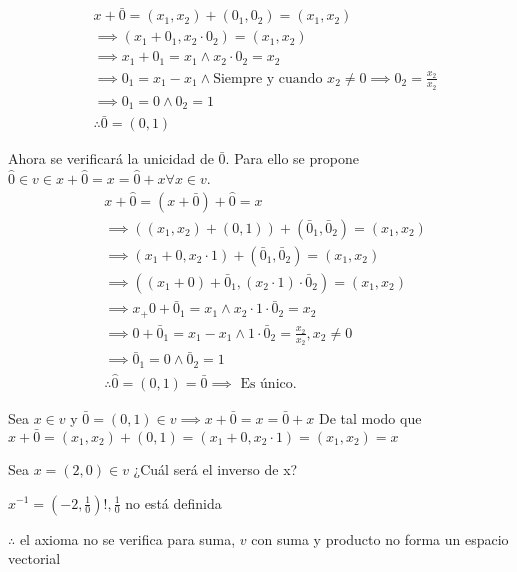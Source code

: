 \begin{exercise}[Sean $x\in v$ y $\bar{0}\in v\implies x+\bar{0}=x=\bar{0}+x$]
	\begin{align*}
		 & x+\bar{0}=(x_1,x_2)+(0_1,0_2)=(x_1,x_2)                                                 \\
		 & \implies (x_1+0_1,x_2\cdot 0_2)=(x_1,x_2)                                               \\
		 & \implies x_1+0_1=x_1\land x_2\cdot 0_2=x_2                                              \\
		 & \implies 0_1=x_1-x_1\land \text{Siempre y cuando }x_2\neq 0\implies 0_2=\frac{x_2}{x_2} \\
		 & \implies 0_1=0\land 0_2=1                                                               \\
		 & \therefore \bar{0}=(0,1)
	\end{align*}

	Ahora se verificará la unicidad de $\bar{0}$. Para ello se propone $\hat{0}\in v \in x+\hat{0}=x=\hat{0}+x\forall x\in v$.
	\begin{align*}
		 & x+\hat{0}=(x+\bar{0})+\hat{0}=x                                               \\
		 & \implies((x_1,x_2)+(0,1))+(\bar{0}_1,\bar{0}_2)=(x_1,x_2)                     \\
		 & \implies (x_1+0,x_2\cdot 1)+(\bar{0}_1,\bar{0}_2)=(x_1,x_2)                   \\
		 & \implies \left((x_1+0)+\bar{0}_1,(x_2\cdot 1)\cdot\bar{0}_2\right)=(x_1,x_2)  \\
		 & \implies x_+0+\bar{0}_1=x_1\land x_2\cdot 1\cdot \bar{0}_2=x_2                \\
		 & \implies 0+\bar{0}_1=x_1-x_1\land 1\cdot \bar{0}_2=\frac{x_2}{x_2}, x_2\neq 0 \\
		 & \implies \bar{0}_1=0\land \bar{0}_2=1                                         \\
		 & \therefore \hat{0}=(0,1)=\bar{0}\implies \text{ Es único.}
	\end{align*}

	Sea $x\in v$ y $\bar{0}=(0,1)\in v\implies x+\bar{0}=x=\bar{0}+x$
	De tal modo que $x+\bar{0}=(x_1,x_2)+(0,1)=(x_1+0,x_2\cdot 1)=(x_1,x_2)=x$
\end{exercise}

\begin{exercise}[$\forall x\in v \exists x^{-1}\in v \implies x+x^{-1}=\bar{0}$]
	Sea $x=(2,0)\in v$ ¿Cuál será el inverso de x?

	$x^{-1}=(-2,\frac{1}{0})!, \frac{1}{0}$ no está definida

	$\therefore$ el axioma no se verifica para suma, $v$ con suma y producto no forma un espacio vectorial
\end{exercise}

